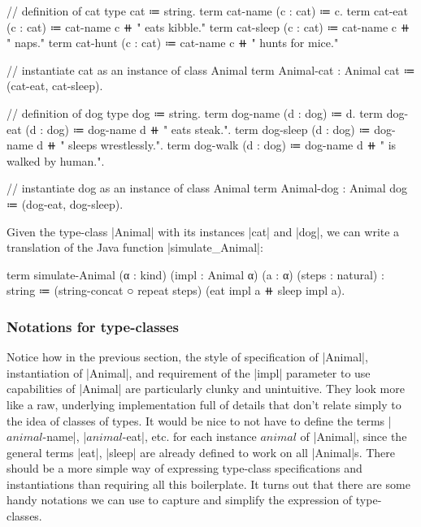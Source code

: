 \begin{snippet}
// definition of cat
type cat ≔ string.
term cat-name  (c : cat) ≔ c.
term cat-eat   (c : cat) ≔ cat-name c ⧺ " eats kibble."
term cat-sleep (c : cat) ≔ cat-name c ⧺ " naps."
term cat-hunt  (c : cat) ≔ cat-name c ⧺ " hunts for mice."

// instantiate cat as an instance of class Animal
term Animal-cat : Animal cat ≔ (cat-eat, cat-sleep).
\end{snippet}
\begin{snippet}
// definition of dog
type dog ≔ string.
term dog-name  (d : dog) ≔ d.
term dog-eat   (d : dog) ≔ dog-name d ⧺ " eats steak.".
term dog-sleep (d : dog) ≔ dog-name d ⧺ " sleeps wrestlessly.".
term dog-walk  (d : dog) ≔ dog-name d ⧺ " is walked by human.".

// instantiate dog as an instance of class Animal
term Animal-dog : Animal dog ≔ (dog-eat, dog-sleep).
\end{snippet}

Given the type-class \code|Animal| with its instances \code|cat| and \code|dog|, we can write a translation of the Java function \code|simulate_Animal|:
\begin{snippet}
term simulate-Animal (α : kind)
      (impl : Animal α) (a : α) (steps : natural)
  : string
  ≔ (string-concat ○ repeat steps)
      (eat impl a ⧺ sleep impl a).
\end{snippet}

\subsubsection{Notations for type-classes}

Notice how in the previous section, the style of specification of \code|Animal|, instantiation of \code|Animal|, and requirement of the \code|impl| parameter to use capabilities of \code|Animal| are particularly clunky and unintuitive.
They look more like a raw, underlying implementation full of details that don't relate simply to the idea of classes of types.
It would be nice to not have to define the terms \code|$animal$-name|, \code|$animal$-eat|, etc. for each instance $animal$ of \code|Animal|, since the general terms \code|eat|, \code|sleep| are already defined to work on all \code|Animal|s.
There should be a more simple way of expressing type-class specifications and instantiations than requiring all this boilerplate.
It turns out that there are some handy notations we can use to capture and simplify the expression of type-classes.

